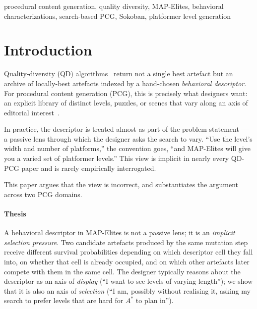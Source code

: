\documentclass[conference]{IEEEtran}
\begin{document}
\begin{IEEEkeywords}
procedural content generation, quality diversity, MAP-Elites,
behavioral characterizations, search-based PCG, Sokoban,
platformer level generation
\end{IEEEkeywords}

\section{Introduction}
\label{sec:intro}

Quality-diversity (QD) algorithms~\cite{lehman2011novelty,
mouret2015illuminating, cully2017qd, pugh2016quality} return not a
single best artefact but an archive of locally-best artefacts indexed
by a hand-chosen \emph{behavioral descriptor}. For procedural content
generation (PCG), this is precisely what designers want: an explicit
library of distinct levels, puzzles, or scenes that vary along an
axis of editorial interest~\cite{gravina2019pcgsurvey,
khalifa2018talakat, fontaine2021illuminating, earle2022illuminating}.

In practice, the descriptor is treated almost as part of the problem
statement --- a passive lens through which the designer asks the
search to vary. ``Use the level's width and number of platforms,''
the convention goes, ``and MAP-Elites will give you a varied set of
platformer levels.'' This view is implicit in nearly every QD-PCG
paper and is rarely empirically interrogated.

This paper argues that the view is incorrect, and substantiates the
argument across two PCG domains.

\paragraph{Thesis} A behavioral descriptor in MAP-Elites is not a
passive lens; it is an \emph{implicit selection pressure}. Two
candidate artefacts produced by the same mutation step receive
different survival probabilities depending on which descriptor cell
they fall into, on whether that cell is already occupied, and on
which other artefacts later compete with them in the same cell. The
designer typically reasons about the descriptor as an axis of
\emph{display} (``I want to see levels of varying length''); we show
that it is also an axis of \emph{selection} (``I am, possibly
without realising it, asking my search to prefer levels that are
hard for $A^{*}$ to plan in'').
\end{document}

